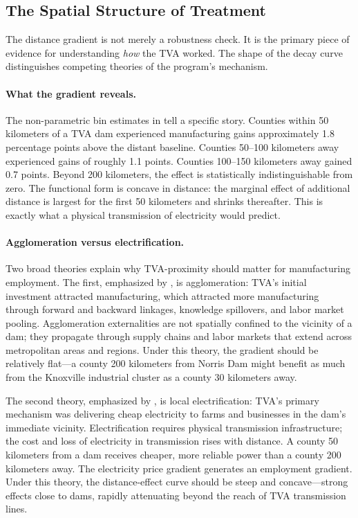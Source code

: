 \documentclass[12pt]{article}
\begin{document}
\subsection{The Spatial Structure of Treatment}

The distance gradient is not merely a robustness check. It is the primary piece of evidence for understanding \textit{how} the TVA worked. The shape of the decay curve distinguishes competing theories of the program's mechanism.

\paragraph{What the gradient reveals.} The non-parametric bin estimates in  tell a specific story. Counties within 50 kilometers of a TVA dam experienced manufacturing gains approximately 1.8 percentage points above the distant baseline. Counties 50--100 kilometers away experienced gains of roughly 1.1 points. Counties 100--150 kilometers away gained 0.7 points. Beyond 200 kilometers, the effect is statistically indistinguishable from zero. The functional form is concave in distance: the marginal effect of additional distance is largest for the first 50 kilometers and shrinks thereafter. This is exactly what a physical transmission of electricity would predict.

\paragraph{Agglomeration versus electrification.} Two broad theories explain why TVA-proximity should matter for manufacturing employment. The first, emphasized by \citet{kline2014}, is agglomeration: TVA's initial investment attracted manufacturing, which attracted more manufacturing through forward and backward linkages, knowledge spillovers, and labor market pooling. Agglomeration externalities are not spatially confined to the vicinity of a dam; they propagate through supply chains and labor markets that extend across metropolitan areas and regions. Under this theory, the gradient should be relatively flat---a county 200 kilometers from Norris Dam might benefit as much from the Knoxville industrial cluster as a county 30 kilometers away.

The second theory, emphasized by \citet{kitchens2014}, is local electrification: TVA's primary mechanism was delivering cheap electricity to farms and businesses in the dam's immediate vicinity. Electrification requires physical transmission infrastructure; the cost and loss of electricity in transmission rises with distance. A county 50 kilometers from a dam receives cheaper, more reliable power than a county 200 kilometers away. The electricity price gradient generates an employment gradient. Under this theory, the distance-effect curve should be steep and concave---strong effects close to dams, rapidly attenuating beyond the reach of TVA transmission lines.
\end{document}
